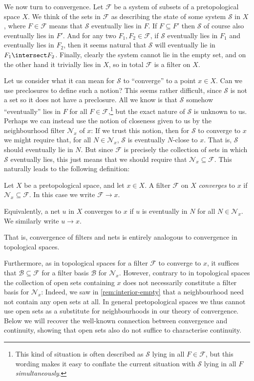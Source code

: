 \documentclass[article, a4paper, 11pt, oneside]{memoir}
\numberwithin{equation}{chapter}
\newcommand{\calB}{\mathcal{B}}
\newcommand{\calF}{\mathcal{F}}
\newcommand{\calS}{\mathcal{S}}
\newcommand{\calN}{\mathcal{N}}
\newcommand{\nhoods}[1]{\calN_{#1}}
\begin{document}
We now turn to convergence. Let $\calF$ be a system of subsets of a pretopological space $X$. We think of the sets in $\calF$ as describing the state of some system $\calS$ in $X$, where $F \in \calF$ means that $\calS$ eventually lies in $F$. If $F \subseteq F'$ then $\calS$ of course also eventually lies in $F'$. And for any two $F_1, F_2 \in \calF$, if $\calS$ eventually lies in $F_1$ and eventually lies in $F_2$, then it seems natural that $\calS$ will eventually lie in $F_1 \intersect F_2$. Finally, clearly the system cannot lie in the empty set, and on the other hand it trivially lies in $X$, so in total $\calF$ is a filter on $X$.

Let us consider what it can mean for $\calS$ to \enquote{converge} to a point $x \in X$. Can we use preclosures to define such a notion? This seems rather difficult, since $\calS$ is not a set so it does not have a preclosure. All we know is that $\calS$ somehow \enquote{eventually} lies in $F$ for all $F \in \calF$,\footnote{This kind of situation is often described as $\calS$ lying in all $F \in \calF$, but this wording makes it easy to conflate the current situation with $\calS$ lying in all $F$ \emph{simultaneously}.} but the exact nature of $\calS$ is unknown to us. Perhaps we can instead use the notion of closeness given to us by the neighbourhood filter $\nhoods{x}$ of $x$: If we trust this notion, then for $\calS$ to converge to $x$ we might require that, for all $N \in \nhoods{x}$, $\calS$ is eventually $N$-close to $x$. That is, $\calS$ should eventually lie in $N$. But since $\calF$ is precisely the collection of sets in which $\calS$ eventually lies, this just means that we should require that $\nhoods{x} \subseteq \calF$. This naturally leads to the following definition:

\begin{definition}[Convergence]
    Let $X$ be a pretopological space, and let $x \in X$. A filter $\calF$ on $X$ \emph{converges} to $x$ if $\nhoods{x} \subseteq \calF$. In this case we write $\calF \to x$.

    Equivalently, a net $u$ in $X$ converges to $x$ if $u$ is eventually in $N$ for all $N \in \nhoods{x}$. We similarly write $u \to x$.
\end{definition}
%
That is, convergence of filters and nets is entirely analogous to convergence in topological spaces.

Furthermore, as in topological spaces for a filter $\calF$ to converge to $x$, it suffices that $\calB \subseteq \calF$ for a filter basis $\calB$ for $\nhoods{x}$. However, contrary to in topological spaces the collection of open sets containing $x$ does not necessarily constitute a filter basis for $\nhoods{x}$: Indeed, we saw in \cref{rem:interior-empty} that a neighbourhood need not contain any open sets at all. In general pretopological spaces we thus cannot use open sets as a substitute for neighbourhoods in our theory of convergence. Below we will recover the well-known connection between convergence and continuity, showing that open sets also do not suffice to characterise continuity.
\end{document}
